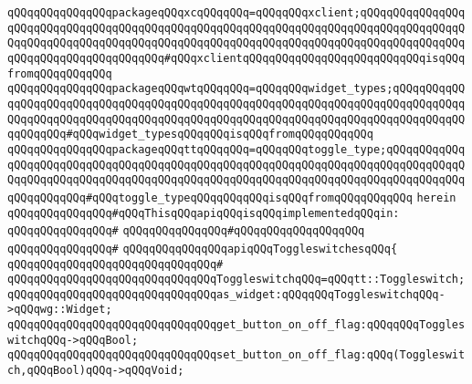 \verb|qQQqqQQqqQQqqQQqpackageqQQqxcqQQqqQQq=qQQqqQQqxclient;qQQqqQQqqQQqqQQqqQQqqQQqqQQqqQQqqQQqqQQqqQQqqQQqqQQqqQQqqQQqqQQqqQQqqQQqqQQqqQQqqQQqqQQqqQQqqQQqqQQqqQQqqQQqqQQqqQQqqQQqqQQqqQQqqQQqqQQqqQQqqQQqqQQqqQQqqQQqqQQqqQQqqQQqqQQqqQQqqQQq#qQQqxclientqQQqqQQqqQQqqQQqqQQqqQQqqQQqisqQQqfromqQQqqQQqqQQq|\newline
\verb|qQQqqQQqqQQqqQQqpackageqQQqwtqQQqqQQq=qQQqqQQqwidget_types;qQQqqQQqqQQqqQQqqQQqqQQqqQQqqQQqqQQqqQQqqQQqqQQqqQQqqQQqqQQqqQQqqQQqqQQqqQQqqQQqqQQqqQQqqQQqqQQqqQQqqQQqqQQqqQQqqQQqqQQqqQQqqQQqqQQqqQQqqQQqqQQqqQQqqQQqqQQqqQQq#qQQqwidget_typesqQQqqQQqisqQQqfromqQQqqQQqqQQq|\newline
\verb|qQQqqQQqqQQqqQQqpackageqQQqttqQQqqQQq=qQQqqQQqtoggle_type;qQQqqQQqqQQqqQQqqQQqqQQqqQQqqQQqqQQqqQQqqQQqqQQqqQQqqQQqqQQqqQQqqQQqqQQqqQQqqQQqqQQqqQQqqQQqqQQqqQQqqQQqqQQqqQQqqQQqqQQqqQQqqQQqqQQqqQQqqQQqqQQqqQQqqQQqqQQqqQQqqQQq#qQQqtoggle_typeqQQqqQQqqQQqisqQQqfromqQQqqQQqqQQq|\newline
\verb|herein|\newline
\newline
\verb|qQQqqQQqqQQqqQQq#qQQqThisqQQqapiqQQqisqQQqimplementedqQQqin:|\newline
\verb|qQQqqQQqqQQqqQQq#|\newline
\verb|qQQqqQQqqQQqqQQq#qQQqqQQqqQQqqQQqqQQq|\newline
\verb|qQQqqQQqqQQqqQQq#|\newline
\verb|qQQqqQQqqQQqqQQqapiqQQqToggleswitchesqQQq{|\newline
\verb|qQQqqQQqqQQqqQQqqQQqqQQqqQQqqQQq#|\newline
\verb|qQQqqQQqqQQqqQQqqQQqqQQqqQQqqQQqToggleswitchqQQq=qQQqtt::Toggleswitch;|\newline
\newline
\verb|qQQqqQQqqQQqqQQqqQQqqQQqqQQqqQQqas_widget:qQQqqQQqToggleswitchqQQq->qQQqwg::Widget;|\newline
\newline
\verb|qQQqqQQqqQQqqQQqqQQqqQQqqQQqqQQqget_button_on_off_flag:qQQqqQQqToggleswitchqQQq->qQQqBool;|\newline
\verb|qQQqqQQqqQQqqQQqqQQqqQQqqQQqqQQqset_button_on_off_flag:qQQq(Toggleswitch,qQQqBool)qQQq->qQQqVoid;|\newline
